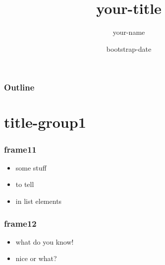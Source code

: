 \documentclass[bigger]{beamer}
\title{your-title}
\author{your-name}
\date{bootstrap-date}
\begin{document}
\maketitle

\begin{frame}
\frametitle{Outline}
\setcounter{tocdepth}{3}
\tableofcontents
\end{frame}



\section{title-group1}
\label{sec-1}
\begin{frame}
\frametitle{frame11}
\label{sec-1-1}
\begin{itemize}

\item some stuff
\label{sec-1-1-1}%

\item to tell
\label{sec-1-1-2}%

\item in list elements
\label{sec-1-1-3}%
\end{itemize} %
\end{frame}
\begin{frame}
\frametitle{frame12}
\label{sec-1-2}
\begin{itemize}

\item what do you know!
\label{sec-1-2-1}%

\item nice or what?
\label{sec-1-2-2}%

\end{itemize} %
\end{frame}
\end{document}
